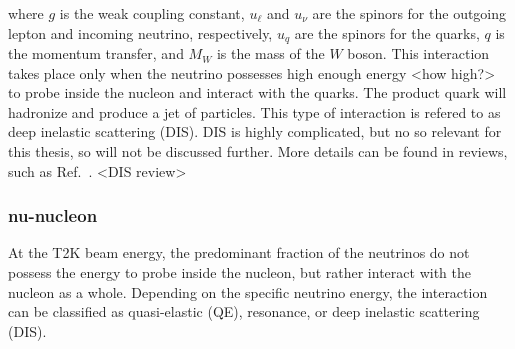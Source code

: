where $g$ is the weak coupling constant, $u_\ell$ and $u_\nu$ are the spinors for the outgoing lepton and incoming neutrino, respectively, $u_q$ are the spinors for the quarks, $q$ is the momentum transfer, and $M_W$ is the mass of the $W$ boson.
This interaction takes place only when the neutrino possesses high enough energy <how high?> to probe inside the nucleon and interact with the quarks.
The product quark will hadronize and produce a jet of particles.
This type of interaction is refered to as deep inelastic scattering (DIS).
DIS is highly complicated, but no so relevant for this thesis, so will not be discussed further.
More details can be found in reviews, such as Ref.~\cite{}. <DIS review>

\subsubsection{nu-nucleon}
At the T2K beam energy, the predominant fraction of the neutrinos do not possess the energy to probe inside the nucleon, but rather interact with the nucleon as a whole.
Depending on the specific neutrino energy, the interaction can be classified as quasi-elastic (QE), resonance, or deep inelastic scattering (DIS).

